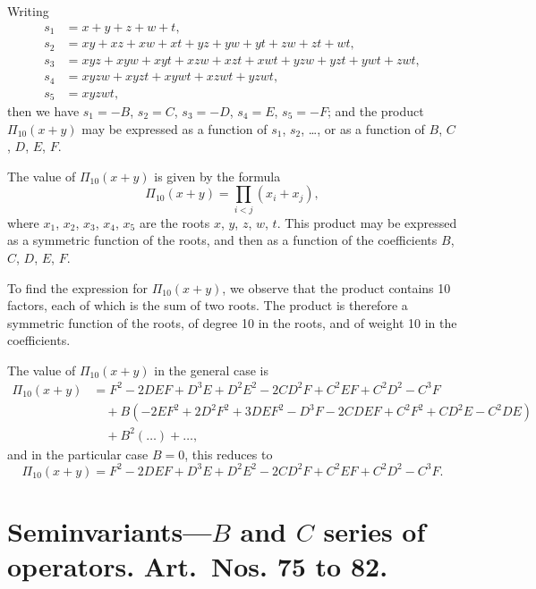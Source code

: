 \documentclass[11pt,a4paper]{book}
\begin{document}
\setcounter{art}{72}
\begin{art}
Writing
\begin{align*}
s_{1} &= x + y + z + w + t, \\
s_{2} &= xy + xz + xw + xt + yz + yw + yt + zw + zt + wt, \\
s_{3} &= xyz + xyw + xyt + xzw + xzt + xwt + yzw + yzt + ywt + zwt, \\
s_{4} &= xyzw + xyzt + xywt + xzwt + yzwt, \\
s_{5} &= xyzwt,
\end{align*}
then we have $s_{1} = -B$, $s_{2} = C$, $s_{3} = -D$, $s_{4} = E$, $s_{5} = -F$; and the product $\Pi_{10}(x + y)$ may be expressed as a function of $s_{1}$, $s_{2}$, \ldots, or as a function of $B$, $C$, $D$, $E$, $F$.
\end{art}

\setcounter{art}{73}
\begin{art}
The value of $\Pi_{10}(x + y)$ is given by the formula
\[
\Pi_{10}(x + y) = \prod_{i < j} (x_{i} + x_{j}),
\]
where $x_{1}$, $x_{2}$, $x_{3}$, $x_{4}$, $x_{5}$ are the roots $x$, $y$, $z$, $w$, $t$. This product may be expressed as a symmetric function of the roots, and then as a function of the coefficients $B$, $C$, $D$, $E$, $F$.

To find the expression for $\Pi_{10}(x + y)$, we observe that the product contains 10 factors, each of which is the sum of two roots. The product is therefore a symmetric function of the roots, of degree 10 in the roots, and of weight 10 in the coefficients.
\end{art}

\setcounter{art}{74}
\begin{art}
The value of $\Pi_{10}(x + y)$ in the general case is
\begin{align*}
\Pi_{10}(x + y) &= F^{2} - 2DEF + D^{3}E + D^{2}E^{2} - 2CD^{2}F + C^{2}EF + C^{2}D^{2} - C^{3}F\\
&\quad + B(-2EF^{2} + 2D^{2}F^{2} + 3DEF^{2} - D^{3}F - 2CDEF + C^{2}F^{2} + CD^{2}E - C^{2}DE)\\
&\quad + B^{2}(\ldots) + \ldots,
\end{align*}
and in the particular case $B = 0$, this reduces to
\[
\Pi_{10}(x + y) = F^{2} - 2DEF + D^{3}E + D^{2}E^{2} - 2CD^{2}F + C^{2}EF + C^{2}D^{2} - C^{3}F.
\]
\end{art}

\section*{Seminvariants---$B$ and $C$ series of operators. Art.~Nos. \textbf{75} to \textbf{82}.}
\end{document}
